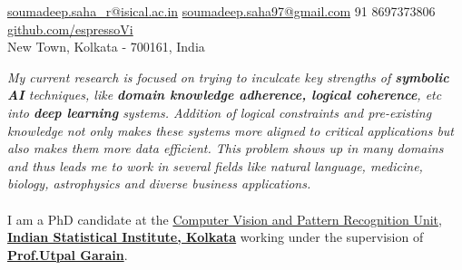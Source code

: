 \documentclass[10pt,a4paper]{article}
\begin{document}
\sloppy


\nobreakvspace{0.3em}

\noindent\href{mailto:soumadeep.saha\_r@isical.ac.in}{soumadeep.saha\_r@isical.ac.in}\sbull
\noindent\href{mailto:soumadeep.saha97@gmail.com}{soumadeep.saha97@gmail.com}\sbull
\textsmaller{+}91 8697373806\sbull
\href{https://github.com/espressoVi}{github.com/espressoVi}\\
New Town, Kolkata - 700161, India

\spacedhrule{0.9em}{-0.4em}


\vspace{-1.3em}  %
\begin{multicols}{2}  %
\noindent \emph{My current research is focused on trying to inculcate key strengths of \textbf{symbolic AI} techniques, like \textbf{domain knowledge adherence, logical coherence}, etc into \textbf{deep learning} systems.
	Addition of logical constraints and pre-existing knowledge not only makes these systems more aligned to critical applications but also makes them more data efficient.
	This problem shows up in many domains and thus leads me to work in several fields like natural language, medicine, biology, astrophysics and diverse business applications.}
\\
\\
	I am a PhD candidate at the \href{https://cvpru.isical.ac.in/}{Computer Vision and Pattern Recognition Unit}, \href{https://www.isical.ac.in/}{\textbf{Indian Statistical Institute, Kolkata}} working under the supervision of \textbf{\href{https://www.isical.ac.in/~utpal}{Prof.\;Utpal Garain}}.
\end{multicols}
\end{document}
